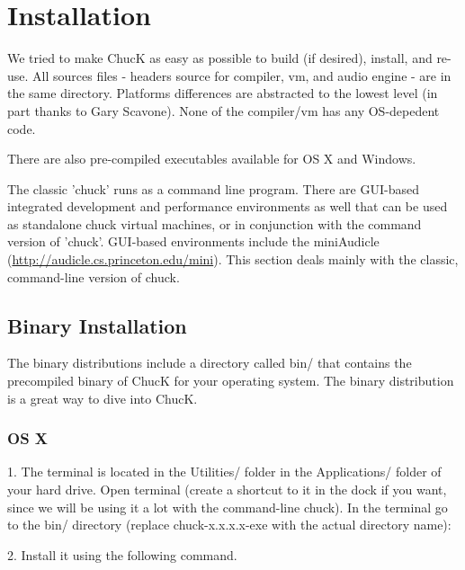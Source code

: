 \chapter{Installation}

We tried to make ChucK as easy as possible to build (if desired), install, and re-use. 
All sources files - headers source for compiler, vm, and audio engine - are 
in the same directory. Platforms differences are abstracted to the lowest level 
(in part thanks to Gary Scavone). None of the compiler/vm has any OS-depedent 
code.

There are also pre-compiled executables available for OS X and Windows.

The classic 'chuck' runs as a command line program.  There are GUI-based integrated
development and performance environments as well that can be used as standalone
chuck virtual machines, or in conjunction with the command version of 'chuck'.  GUI-based
environments include the miniAudicle (\href{http://audicle.cs.princeton.edu/mini/}{http://audicle.cs.princeton.edu/mini}).  This section deals mainly with the classic, command-line
version of chuck.

\section{Binary Installation}

The binary distributions include a directory called bin/ that contains the precompiled binary of ChucK for your operating system. The binary distribution is a great way to dive into ChucK.

\subsection{OS X}
1. The terminal is located in the Utilities/ folder in the Applications/ folder of your hard drive.  Open terminal (create a shortcut to it in the dock if you want, since we will be using it a lot
with the command-line chuck).  In the terminal go to the bin/ directory (replace chuck-x.x.x.x-exe with the actual directory name):


2. Install it using the following command.



